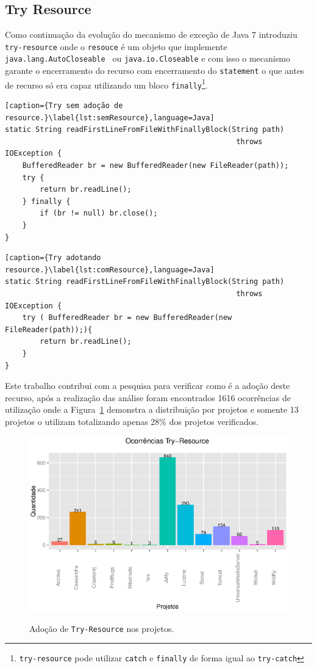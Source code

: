 \subsection{Try Resource}
Como continuação da evolução do mecanismo de exceção de Java 7 introduziu \texttt{try-resource} onde o \texttt{resouce} é um objeto que implemente \texttt{java.lang.AutoCloseable } ou \texttt{java.io.Closeable} e com isso o mecanismo garante o encerramento do recurso com encerramento do \texttt{statement} o que antes de recurso só era capaz utilizando um bloco \texttt{finally}\footnote{\texttt{try-resource} pode utilizar \texttt{catch} e \texttt{finally} de forma igual ao \texttt{try-catch}}.

\begin{lstlisting}[caption={Try sem adoção de resource.}\label{lst:semResource},language=Java]
static String readFirstLineFromFileWithFinallyBlock(String path)
                                                     throws IOException {
    BufferedReader br = new BufferedReader(new FileReader(path));
    try {
        return br.readLine();
    } finally {
        if (br != null) br.close();
    }
}
\end{lstlisting}

\begin{lstlisting}[caption={Try adotando resource.}\label{lst:comResource},language=Java]
static String readFirstLineFromFileWithFinallyBlock(String path)
                                                     throws IOException {
    try ( BufferedReader br = new BufferedReader(new FileReader(path));){
        return br.readLine();
    } 
}
\end{lstlisting}

Este trabalho contribui com a pesquisa para verificar como é a adoção deste recurso, após a realização das análise foram encontrados \num{1616} ocorrências de utilização onde a Figura~\ref{fig:Try-Resource} demonstra a distribuição por projetos e somente 13 projetos o utilizam totalizando apenas \num{28}\% dos projetos verificados.

\begin{figure}[h]
	\center
	\includegraphics[scale=0.55]{Imagens/ocorrenciasTryResource}
	\label{fig:Try-Resource}
	\caption{Adoção de \texttt{Try-Resource} nos projetos.}
\end{figure}


